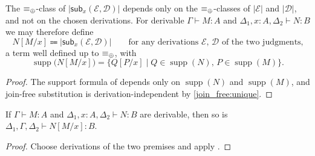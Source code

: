 \begin{corollary}
\label{prop:subst_derivation_independence}
The $\equiv_{\mathbin{\oplus}}$-class of $|\mathsf{sub}_x(\mathcal{E},\mathcal{D})|$ depends only on the $\equiv_{\mathbin{\oplus}}$-classes of $|\mathcal{E}|$ and $|\mathcal{D}|$, and not on the chosen derivations.
For derivable $\Gamma \vdash M : A$ and $\Delta_1, x : A, \Delta_2 \vdash N : B$ we may therefore define
\[
N[M/x] \Coloneqq |\mathsf{sub}_x(\mathcal{E}, \mathcal{D})| \qquad \text{for any derivations $\mathcal{E}$, $\mathcal{D}$ of the two judgments,}
\]
a term well defined up to $\equiv_{\mathbin{\oplus}}$, with
\[
\operatorname{supp}\bigl(N[M/x]\bigr) = \{ Q[P/x] \mid Q \in \operatorname{supp}(N),\, P \in \operatorname{supp}(M) \}.
\]
\end{corollary}
\begin{proof}
The support formula of  depends only on $\operatorname{supp}(N)$ and $\operatorname{supp}(M)$, and join-free substitution is derivation-independent by \ref{join_free:unique}.
\end{proof}

\begin{lemma}
\label{lemma:subst_admissible}
If $\Gamma \vdash M : A$ and $\Delta_1, x : A, \Delta_2 \vdash N : B$ are derivable, then so is
$\Delta_1, \Gamma, \Delta_2 \vdash N[M/x] : B$.
\end{lemma}
\begin{proof}
Choose derivations of the two premises and apply .
\end{proof}

